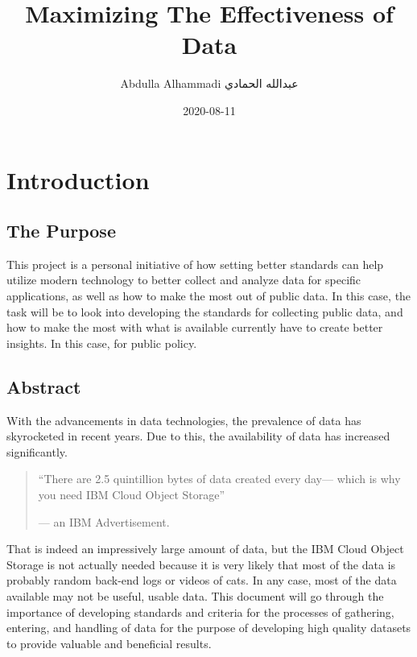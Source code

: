 \documentclass[
]{book}
\title{Maximizing The Effectiveness of Data}
\author{Abdulla Alhammadi \textbar{} عبدالله الحمادي}
\date{2020-08-11}
\begin{document}
\maketitle

{
\setcounter{tocdepth}{1}
\tableofcontents
}
\hypertarget{intro}{%
\chapter{Introduction}\label{intro}}

\hypertarget{the-purpose}{%
\section{The Purpose}\label{the-purpose}}

This project is a personal initiative of how setting better standards can help utilize modern technology to better collect and analyze data for specific applications, as well as how to make the most out of public data. In this case, the task will be to look into developing the standards for collecting public data, and how to make the most with what is available currently have to create better insights. In this case, for public policy.

\hypertarget{abstract}{%
\section{Abstract}\label{abstract}}

With the advancements in data technologies, the prevalence of data has skyrocketed in recent years. Due to this, the availability of data has increased significantly.

\begin{quote}
``There are 2.5 quintillion bytes of data created every day---
which is why you need IBM Cloud Object Storage''

--- an IBM Advertisement.
\end{quote}

That is indeed an impressively large amount of data, but the IBM Cloud Object Storage is not actually needed because it is very likely that most of the data is probably random back-end logs or videos of cats. In any case, most of the data available may not be useful, usable data. This document will go through the importance of developing standards and criteria for the processes of gathering, entering, and handling of data for the purpose of developing high quality datasets to provide valuable and beneficial results.
\end{document}
